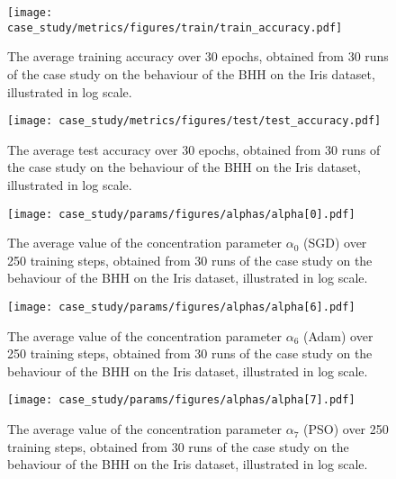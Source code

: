 \begin{figure}[htpb]
	\centering
	\texttt{[image: case\_study/metrics/figures/train/train\_accuracy.pdf]}
	\caption{The average training accuracy over 30 epochs, obtained from 30 runs of the case study on the behaviour of the \acs{BHH} on the Iris dataset, illustrated in log scale.}
	\label{fig:results:case_study:train_accuracy}
\end{figure}

\begin{figure}[htpb]
	\centering
	\texttt{[image: case\_study/metrics/figures/test/test\_accuracy.pdf]}
	\caption{The average test accuracy over 30 epochs, obtained from 30 runs of the case study on the behaviour of the \acs{BHH} on the Iris dataset, illustrated in log scale.}
	\label{fig:results:case_study:test_accuracy}
\end{figure}




\begin{figure}[htpb]
	\centering
	\texttt{[image: case\_study/params/figures/alphas/alpha[0].pdf]}
	\caption{The average value of the concentration parameter $\alpha_{0}$ (\acs{SGD}) over 250 training steps, obtained from 30 runs of the case study on the behaviour of the \acs{BHH} on the Iris dataset, illustrated in log scale.}
	\label{fig:results:case_study:alpha:0}
\end{figure}

\begin{figure}[htpb]
	\centering
	\texttt{[image: case\_study/params/figures/alphas/alpha[6].pdf]}
	\caption{The average value of the concentration parameter $\alpha_{6}$ (\acs{Adam}) over 250 training steps, obtained from 30 runs of the case study on the behaviour of the \acs{BHH} on the Iris dataset, illustrated in log scale.}
	\label{fig:results:case_study:alpha:6}
\end{figure}

\begin{figure}[htpb]
	\centering
	\texttt{[image: case\_study/params/figures/alphas/alpha[7].pdf]}
	\caption{The average value of the concentration parameter $\alpha_{7}$ (\acs{PSO}) over 250 training steps, obtained from 30 runs of the case study on the behaviour of the \acs{BHH} on the Iris dataset, illustrated in log scale.}
	\label{fig:results:case_study:alpha:7}
\end{figure}

